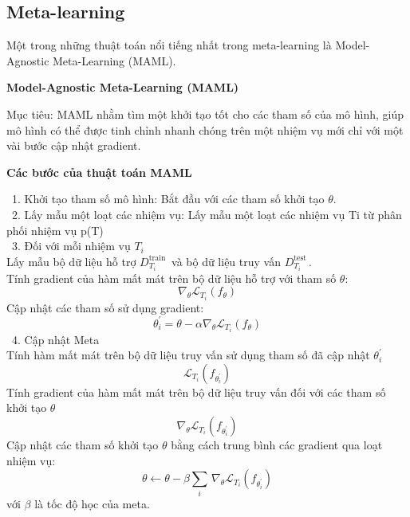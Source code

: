 \subsection{Meta-learning}
Một trong những thuật toán nổi tiếng nhất trong meta-learning là Model-Agnostic Meta-Learning (MAML).
\par
\textbf{Model-Agnostic Meta-Learning (MAML)}
\par
Mục tiêu: MAML nhằm tìm một khởi tạo tốt cho các tham số của mô hình, giúp mô hình có thể được tinh chỉnh nhanh chóng trên một nhiệm vụ mới chỉ với một vài bước cập nhật gradient.
\par
\textbf{Các bước của thuật toán MAML}
\par
    \indent\textbullet\ 1.	Khởi tạo tham số mô hình: Bắt đầu với các tham số khởi tạo \(\theta\).\\
    \indent\textbullet\ 2.	Lấy mẫu một loạt các nhiệm vụ: Lấy mẫu một loạt các nhiệm vụ {Ti} từ phân phối nhiệm vụ p(T)\\
    \indent\textbullet\ 3. Đối với mỗi nhiệm vụ \(T_i\)\\
    	Lấy mẫu bộ dữ liệu hỗ trợ \(D_{T_i}^{\mathrm{train\ }}\) và bộ dữ liệu truy vấn \(D_{T_i}^{\mathrm{test\ }}\).\\
     	Tính gradient của hàm mất mát trên bộ dữ liệu hỗ trợ với tham số \(\theta\):
            \[\nabla_\theta\mathcal{L}_{T_i}\left(f_\theta\right)\] 
            Cập nhật các tham số sử dụng gradient:
            \[\theta_i^\prime=\theta-\alpha\nabla_\theta\mathcal{L}_{T_i}\left(f_\theta\right)\] 
        \indent\textbullet\ 4. Cập nhật Meta\\
            Tính hàm mất mát trên bộ dữ liệu truy vấn sử dụng tham số đã cập nhật \(\theta_i^\prime\) 
            \[\mathcal{L}_{T_i}\left(f_{\theta_i^\prime}\right)\]
            Tính gradient của hàm mất mát trên bộ dữ liệu truy vấn đối với các tham số khởi tạo \(\theta\) 
            \[\nabla_\theta\mathcal{L}_{T_i}\left(f_{\theta_i^\prime}\right)\] 
            Cập nhật các tham số khởi tạo \(\theta\) bằng cách trung bình các gradient qua loạt nhiệm vụ:
            \[\theta \gets \theta - \beta \sum_{i} \, \nabla_{\theta} \mathcal{L}_{T_{i}} \left( f_{\theta_{i}^{\prime}} \right)\]
            với \(\beta\) là tốc độ học của meta.

